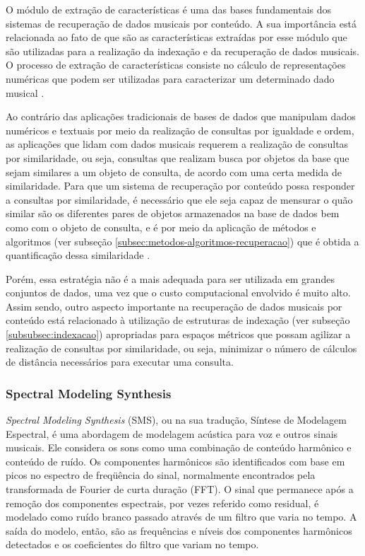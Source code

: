 O módulo de extração de características é uma das bases fundamentais dos sistemas de recuperação de dados musicais por conteúdo. A sua importância está relacionada ao fato de que são as características extraídas por esse módulo que são utilizadas para a realização da indexação e da recuperação de dados musicais. O processo de extração de características consiste no cálculo de representações numéricas que podem ser utilizadas para caracterizar um determinado dado musical \cite{traina2003}.

Ao contrário das aplicações tradicionais de bases de dados que manipulam dados numéricos e textuais por meio da realização de consultas por igualdade e ordem, as aplicações que lidam com dados musicais requerem a realização de consultas por similaridade, ou seja, consultas que realizam busca por objetos da base que sejam similares a um objeto de consulta, de acordo com uma certa medida de similaridade. Para que um sistema de recuperação por conteúdo possa responder a consultas por similaridade, é necessário que ele seja capaz de mensurar o quão similar são os diferentes pares de objetos armazenados na base de dados bem como com o objeto de consulta, e é por meio da aplicação de métodos e algoritmos (ver subseção \ref{subsec:metodos-algoritmos-recuperacao}) que é obtida a quantificação dessa similaridade \cite{bohm2001, chavez2001}.

Porém, essa estratégia não é a mais adequada para ser utilizada em grandes conjuntos de dados, uma vez que o custo computacional envolvido é muito alto. Assim sendo, outro aspecto importante na recuperação de dados musicais por conteúdo está relacionado à utilização de estruturas de indexação (ver subseção \ref{subsubsec:indexacao}) apropriadas para espaços métricos que possam agilizar a realização de consultas por similaridade, ou seja, minimizar o número de cálculos de distância necessários para executar uma consulta.

\subsubsection{Spectral Modeling Synthesis} \label{subsubsec:sms}
\textit{Spectral Modeling Synthesis} (SMS), ou na sua tradução, Síntese de Modelagem Espectral, é uma abordagem de modelagem acústica para voz e outros sinais musicais. Ele considera os sons como uma combinação de conteúdo harmônico e conteúdo de ruído. Os componentes harmônicos são identificados com base em picos no espectro de freqüência do sinal, normalmente encontrados pela transformada de Fourier de curta duração (FFT). O sinal que permanece após a remoção dos componentes espectrais, por vezes referido como residual, é modelado como ruído branco passado através de um filtro que varia no tempo. A saída do modelo, então, são as frequências e níveis dos componentes harmônicos detectados e os coeficientes do filtro que variam no tempo.

